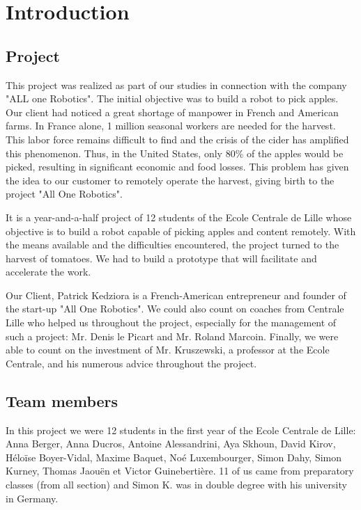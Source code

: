 \section*{Introduction}
\setcounter{figure}{0}

\subsection*{Project}

This project was realized as part of our studies in connection with the company "ALL one Robotics". The initial objective was to build a robot to pick apples. Our client had noticed a great shortage of manpower in French and American farms. In France alone, 1 million seasonal workers are needed for the harvest. This labor force remains difficult to find and the crisis of the cider has amplified this phenomenon. Thus, in the United States, only 80\% of the apples would be picked, resulting in significant economic and food losses. This problem has given the idea to our customer to remotely operate the harvest, giving birth to the project "All One Robotics". 

\bigbreak
It is a year-and-a-half project of 12 students of the Ecole Centrale de Lille whose objective is to build a robot capable of picking apples and content remotely. With the means available and the difficulties encountered, the project turned to the harvest of tomatoes. We had to build a prototype that will facilitate and accelerate the work.

\bigbreak
Our Client, Patrick Kedziora is a French-American entrepreneur and founder of the start-up "All One Robotics". We could also count on coaches from Centrale Lille who helped us throughout the project, especially for the management of such a project: Mr. Denis le Picart and Mr. Roland Marcoin. Finally, we were able to count on the investment of Mr. Kruszewski, a professor at the Ecole Centrale, and his numerous advice throughout the project.

\subsection*{Team members}

In this project we were 12 students in the first year of the Ecole Centrale de Lille: Anna Berger, Anna Ducros, Antoine Alessandrini, Aya Skhoun, David Kirov, Héloïse Boyer-Vidal, Maxime Baquet, Noé Luxembourger, Simon Dahy, Simon Kurney, Thomas Jaouën et Victor Guinebertière. 11 of us came from preparatory classes (from all section) and Simon K. was in double degree with his university in Germany. 

